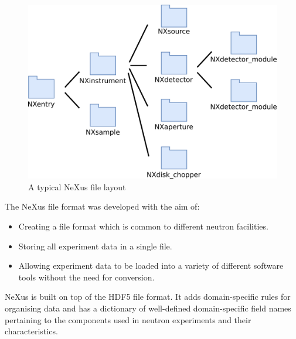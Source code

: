 \begin{figure}
\begin{center}
\includegraphics[width=0.8\linewidth]{instrument_arch.png}
\end{center}
\caption{A typical NeXus file layout}
\end{figure}


The NeXus file format was developed with the aim of:
\begin{itemize}
\item Creating a file format which is common to different neutron facilities.
\item Storing all experiment data in a single file.
\item Allowing experiment data to be loaded into a variety of different software tools without the need for conversion.
\end{itemize}

\smallskip

NeXus is built on top of the HDF5 file format. It adds domain-specific rules for organising data and has a dictionary of well-defined domain-specific field names pertaining to the components used in neutron experiments and their characteristics.
